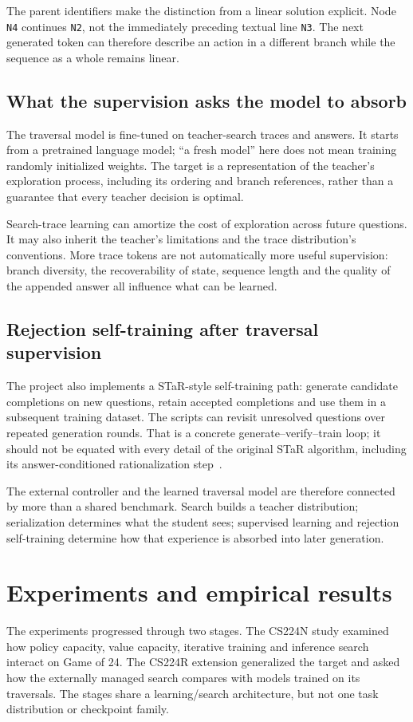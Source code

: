 \documentclass[11pt,letterpaper]{article}
\begin{document}
The parent identifiers make the distinction from a linear solution explicit. Node \texttt{N4} continues \texttt{N2}, not the immediately preceding textual line \texttt{N3}. The next generated token can therefore describe an action in a different branch while the sequence as a whole remains linear.

\subsection{What the supervision asks the model to absorb}
The traversal model is fine-tuned on teacher-search traces and answers. It starts from a pretrained language model; ``a fresh model'' here does not mean training randomly initialized weights. The target is a representation of the teacher's exploration process, including its ordering and branch references, rather than a guarantee that every teacher decision is optimal.

Search-trace learning can amortize the cost of exploration across future questions. It may also inherit the teacher's limitations and the trace distribution's conventions. More trace tokens are not automatically more useful supervision: branch diversity, the recoverability of state, sequence length and the quality of the appended answer all influence what can be learned.

\subsection{Rejection self-training after traversal supervision}
The project also implements a STaR-style self-training path: generate candidate completions on new questions, retain accepted completions and use them in a subsequent training dataset. The scripts can revisit unresolved questions over repeated generation rounds. That is a concrete generate--verify--train loop; it should not be equated with every detail of the original STaR algorithm, including its answer-conditioned rationalization step~\cite{star}.

The external controller and the learned traversal model are therefore connected by more than a shared benchmark. Search builds a teacher distribution; serialization determines what the student sees; supervised learning and rejection self-training determine how that experience is absorbed into later generation.

\clearpage
\section{Experiments and empirical results}
\label{sec:results}
The experiments progressed through two stages. The CS224N study examined how policy capacity, value capacity, iterative training and inference search interact on Game of 24. The CS224R extension generalized the target and asked how the externally managed search compares with models trained on its traversals. The stages share a learning/search architecture, but not one task distribution or checkpoint family.
\end{document}

